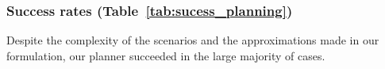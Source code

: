 \documentclass[journal]{IEEEtran}
\providecommand{\DIFaddtex}[1]{#1} %
\providecommand{\DIFdeltex}[1]{} %
\providecommand{\DIFaddbegin}{\protect\color{blue}} %
\providecommand{\DIFaddend}{\protect\color{black}} %
\providecommand{\DIFdelbegin}{\protect\cbdelete} %
\providecommand{\DIFdelend}{} %
\providecommand{\DIFdelFL}[1]{\DIFdel{#1}} %
\providecommand{\DIFadd}[1]{\texorpdfstring{\DIFaddtex{#1}}{#1}} %
\providecommand{\DIFdel}[1]{\texorpdfstring{\DIFdeltex{#1}}{}} %
\begin{document}
\DIFdelbegin %
\DIFdelFL{Path planning success rate }%
\DIFdelFL{Stairs     	}%
\DIFdelFL{100\% }%
\DIFdelFL{Standing			}%
\DIFdelFL{68\% 	}%
\DIFdelFL{Car 			}%
\DIFdelFL{77\% 	}%
\DIFdelFL{Rubble 				}%
\DIFdelFL{97\% 	}%
\DIFdelFL{Race        }%
\DIFdelFL{88.0\% 	}%
{%
\DIFdelFL{Percentage of successful complete contact planning rates for each scenario, rounded to the first decimal.}}
\DIFdelend \DIFaddbegin \subsubsection{\DIFadd{Success rates (Table~\ref{tab:sucess_planning})}}
\DIFadd{Despite the complexity of the scenarios and the approximations made in our formulation, our planner succeeded in the large majority of cases.
}\DIFaddend 
\end{document}
